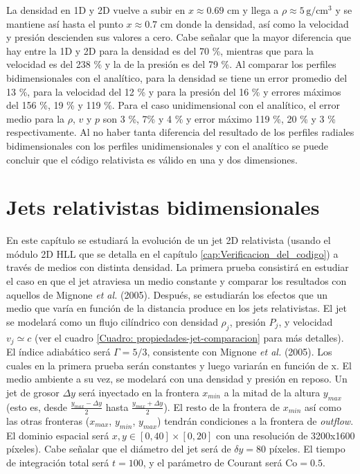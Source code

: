 \documentclass[12pt,a4paper]{book}
\begin{document}
La densidad en 1D y 2D vuelve a subir
en $x \approx 0.69$ cm y llega a $\rho \approx 5 \,  \text{g}/ \text{cm}^3$ y 
se mantiene así hasta el punto $x \approx 0.7$ cm 
donde la densidad, así como la velocidad y presión descienden sus valores a cero.
Cabe señalar que la mayor diferencia que hay entre la 1D y 2D para la densidad es del 70 \%, mientras que para la 
velocidad es del 238 \% y la de la presión es del 79 \%.
Al comparar los perfiles bidimensionales con el analítico, para la densidad se tiene un error promedio del
13 \%, para la velocidad del 12 \% y para la presión del 16 \% y errores máximos del 156 \%, 19 \% y 119 \%. 
Para el caso unidimensional con el analítico, el error medio para la $\rho$, $v$ y $p$ son 
3 \%,  7\% y  4 \% y error máximo 119 \%, 20 \% y 3 \% respectivamente.
Al no haber tanta diferencia del resultado de los perfiles radiales bidimensionales con 
los perfiles unidimensionales y con el analítico se puede concluir que el código relativista es válido
en una y dos dimensiones.





\chapter{Jets relativistas bidimensionales}

En este capítulo se estudiará la evolución de un jet 2D relativista (usando el módulo 2D HLL que se detalla en el capítulo \ref{cap:Verificacion_del_codigo}) a través de medios con distinta densidad. La primera prueba consistirá en estudiar el caso en que el jet atraviesa un medio constante y  comparar los resultados con aquellos de Mignone \emph{et al.} (2005). 
Después, se estudiarán los efectos que un medio que varía en función de la distancia produce en los jets relativistas.
El jet se modelará como un flujo cilíndrico con densidad $\rho_j$, presión $P_j$,  y velocidad $v_j \simeq c$ 
(ver el cuadro \ref{Cuadro: propiedades-jet-comparacion} para más detalles). El índice adiabático será $\Gamma = 5/3$, 
consistente con Mignone \emph{et al.} (2005). 
Los cuales en la primera prueba serán constantes y luego variarán en función de x. El medio ambiente a su vez, 
se modelará con una densidad y presión en reposo. Un jet de grosor $\Delta y$ será inyectado 
en la frontera $x_{min}$ a la mitad de la altura $y_{max}$ (esto es, desde $\frac{y_{max}-\Delta y}{2}$ hasta 
$\frac{y_{max}+ \Delta y}{2}$). 
El resto de la frontera de $x_{min}$ así como las otras fronteras ($x_{max}$, $y_{min}$, $y_{max}$) tendrán condiciones a la
frontera de \emph{outflow}. 
El dominio espacial será $x, y \in [0,40]\times[0,20]$ con una resolución de 3200x1600 píxeles). 
Cabe señalar que el diámetro del jet será de $\delta y=80$ píxeles. El tiempo de integración total será $t = 100$, y el parámetro de Courant será $\text{Co} = 0.5$.
\end{document}

